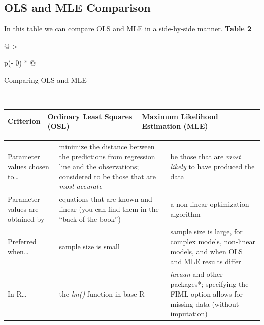 \documentclass[
  11pt,
]{book}
\begin{document}
\hypertarget{ols-and-mle-comparison}{%
\subsection{OLS and MLE Comparison}\label{ols-and-mle-comparison}}

In this table we can compare OLS and MLE in a side-by-side manner.
\textbf{Table 2}

\begin{longtable}[]{@{}
  >{\raggedright\arraybackslash}p{(\columnwidth - 0\tabcolsep) * }@{}}
\toprule
\begin{minipage}[b]{\linewidth}\raggedright
Comparing OLS and MLE \citep{cohen_applied_2003, myung_tutorial_2003}
\end{minipage} \\
\midrule
\endhead
\bottomrule
\end{longtable}

\begin{longtable}[]{@{}
  >{\centering\arraybackslash}p{}
  >{\centering\arraybackslash}p{}
  >{\centering\arraybackslash}p{}@{}}
\toprule
\endhead
\textbf{Criterion} & \textbf{Ordinary Least Squares (OSL)} & \textbf{Maximum Likelihood Estimation (MLE)} \\
\bottomrule
\end{longtable}

\begin{longtable}[]{@{}
  >{\centering\arraybackslash}p{}
  >{\centering\arraybackslash}p{}
  >{\centering\arraybackslash}p{}@{}}
\toprule
\endhead
Parameter values chosen to\ldots{} & minimize the distance between the predictions from regression line and the observations; considered to be those that are \emph{most accurate} & be those that are \emph{most likely} to have produced the data \\
Parameter values are obtained by & equations that are known and linear (you can find them in the ``back of the book'') & a non-linear optimization algorithm \\
Preferred when\ldots{} & sample size is small & sample size is large, for complex models, non-linear models, and when OLS and MLE results differ \\
In R\ldots{} & the \emph{lm()} function in base R & \emph{lavaan} and other packages*; specifying the FIML option allows for missing data (without imputation) \\
\bottomrule
\end{longtable}
\end{document}
